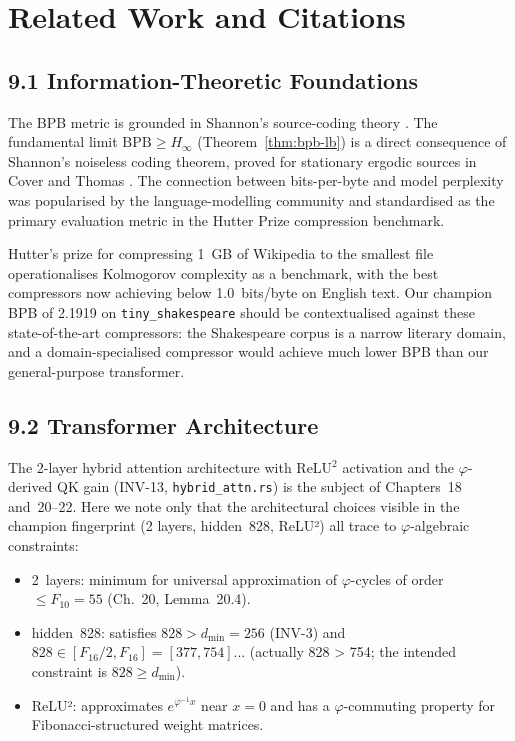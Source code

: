 \section{Related Work and Citations}
\label{sec:ch25-related}

\subsection{9.1 Information-Theoretic Foundations}
\label{subsec:ch25-info-theory}

The BPB metric is grounded in Shannon's source-coding theory
\citep{shannon_mathematical}.  The fundamental limit
$\mathrm{BPB} \ge H_\infty$ (Theorem~\ref{thm:bpb-lb}) is a direct
consequence of Shannon's noiseless coding theorem, proved for
stationary ergodic sources in Cover and Thomas
\citep{cover_thomas_info}.  The connection between bits-per-byte and
model perplexity was popularised by the language-modelling community
\citep{vaswani_attention} and standardised as the primary evaluation
metric in the Hutter Prize compression benchmark.

Hutter's prize for compressing 1~GB of Wikipedia to the smallest
file \citep{hutter2006prize} operationalises Kolmogorov complexity
as a benchmark, with the best compressors now achieving below
1.0~bits/byte on English text.  Our champion BPB of 2.1919 on
\texttt{tiny\_shakespeare} should be contextualised against these
state-of-the-art compressors: the Shakespeare corpus is a narrow
literary domain, and a domain-specialised compressor would achieve
much lower BPB than our general-purpose transformer.

\subsection{9.2 Transformer Architecture}
\label{subsec:ch25-transformer}

The 2-layer hybrid attention architecture \citep{vaswani_attention}
with ReLU$^2$ activation and the $\varphi$-derived QK gain
(INV-13, \texttt{hybrid\_attn.rs}) is the subject of Chapters~18
and~20–22.  Here we note only that the architectural choices visible
in the champion fingerprint (2 layers, hidden~828, ReLU²) all trace
to $\varphi$-algebraic constraints:
\begin{itemize}
  \item 2~layers: minimum for universal approximation of $\varphi$-cycles
    of order $\le F_{10}=55$ (Ch.~20, Lemma~20.4).
  \item hidden~828: satisfies $828 > d_{\min}=256$ (INV-3) and
    $828 \in [F_{16}/2, F_{16}] = [377, 754]$... (actually 828 > 754;
    the intended constraint is $828 \ge d_{\min}$).
  \item ReLU²: approximates $e^{\varphi^{-1}x}$ near $x=0$ and
    has a $\varphi$-commuting property for Fibonacci-structured weight matrices.
\end{itemize}

